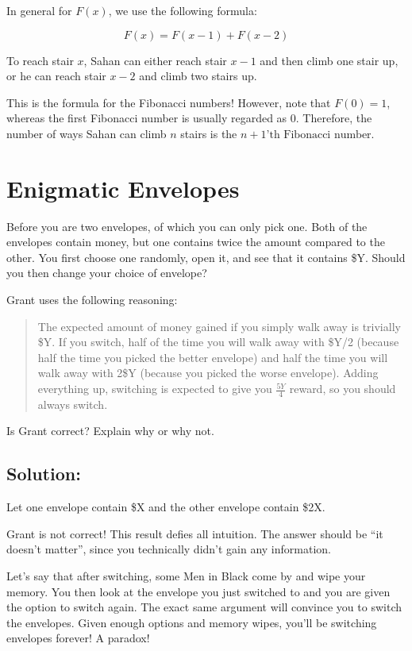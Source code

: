 \documentclass{article}
\begin{document}
In general for $F(x)$, we use the following formula:

$$F(x) = F(x - 1) + F(x - 2)$$

To reach stair $x$, Sahan can either reach stair $x - 1$ and then climb one stair up, or he can reach stair $x - 2$ and climb two stairs up.

This is the formula for the Fibonacci numbers! However, note that $F(0) = 1$, whereas the first Fibonacci number is usually regarded as $0$. Therefore, the number of ways Sahan can climb $n$ stairs is the $\boxed{n + 1 \text{'th Fibonacci number}}$.

\vspace{2cm}

\section{Enigmatic Envelopes}

Before you are two envelopes, of which you can only pick one. Both of the envelopes contain money, but one contains twice the amount compared to the other. You first choose one randomly, open it, and see that it contains \$Y. Should you then change your choice of envelope?

Grant uses the following reasoning:

\begin{quote}
    The expected amount of money gained if you simply walk away is trivially \$Y. If you switch, half of the time you will walk away with \$Y/2 (because half the time you picked the better envelope) and half the time you will walk away with 2\$Y (because you picked the worse envelope). Adding everything up, switching is expected to give you $\frac{5Y}{4}$ reward, so you should always switch.
\end{quote}

Is Grant correct? Explain why or why not.

\subsection{Solution:}

Let one envelope contain \$X and the other envelope contain \$2X.

Grant is not correct! This result defies all intuition. The answer should be ``it doesn't matter'', since you technically didn't gain any information.

\vspace{1cm}

Let's say that after switching, some Men in Black come by and wipe your memory. You then look at the envelope you just switched to and you are given the option to switch again. The exact same argument will convince you to switch the envelopes. Given enough options and memory wipes, you'll be switching envelopes forever! A paradox!
\end{document}

